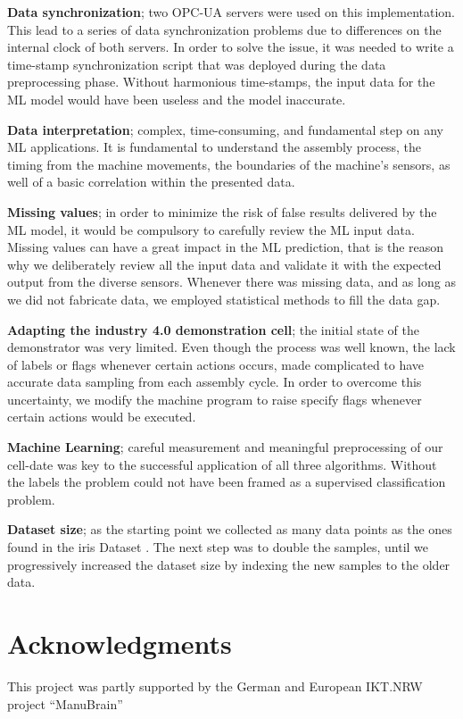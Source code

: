 \documentclass[5p,times,procedia]{elsarticle}
\begin{document}
\textbf{Data synchronization}; two OPC-UA servers were used on this implementation. This lead to a series of data synchronization problems due to differences on the internal clock of both servers.
In order to solve the issue, it was needed to write a time-stamp synchronization script that was deployed during the data preprocessing phase. Without harmonious time-stamps, the input data for the ML model would have been useless and the model inaccurate. 

\textbf{Data interpretation}; complex, time-consuming, and fundamental step on any ML applications. It is fundamental to understand the assembly process, the timing from the machine movements, the boundaries of the machine's sensors, as well of a basic correlation within the presented data.

\textbf{Missing values}; in order to minimize the risk of false results delivered by the ML model, it would be compulsory to carefully review the ML input data. Missing values can have a great impact in the ML prediction, that is the reason why we deliberately review all the input data and validate it with the expected output from the diverse sensors. Whenever there was missing data, and as long as we did not fabricate data, we employed statistical methods to fill the data gap.

\textbf{Adapting the industry 4.0 demonstration cell}; the initial state of the demonstrator was very limited. Even though the process was well known, the lack of labels or flags whenever certain actions occurs, made complicated to have accurate data sampling from each assembly cycle. In order to overcome this uncertainty, we modify the machine program to raise specify flags whenever certain actions would be executed.

\textbf{Machine Learning}; careful measurement and  meaningful preprocessing
of our cell-date was key to the successful application of all three algorithms.
Without the labels the problem could not have been framed as a supervised 
classification problem.

\textbf{Dataset size}; as the starting point we collected as many data points as the ones found in the iris Dataset \cite{fisher_1936}. The next step was to double the samples, until we progressively increased the dataset size by indexing the new samples to the older data. 

\section*{Acknowledgments}
This project was partly supported by the German and European IKT.NRW
project "`ManuBrain"' 



\end{document}
